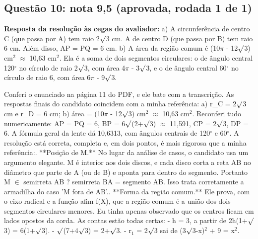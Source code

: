 \documentclass{article}%
\begin{document}
\subsection*{Questão 10: nota 9,5 (aprovada, rodada 1 de 1)}%
\textbf{Resposta da resolução às cegas do avaliador:} a) A circunferência de centro C (que passa por A) tem raio 2$\surd$3 cm. A de centro D (que passa por B) tem raio 6 cm. Além disso, AP = PQ = 6 cm.\newline%
\newline%
b) A área da região comum é (10$\pi$ - 12$\surd$3) cm$^2$ $\approx$ 10,63 cm$^2$. Ela é a soma de dois segmentos circulares: o de ângulo central 120$^\circ$ no círculo de raio 2$\surd$3, com área 4$\pi$ - 3$\surd$3, e o de ângulo central 60$^\circ$ no círculo de raio 6, com área 6$\pi$ - 9$\surd$3.\par %
Conferi o enunciado na página 11 do PDF, e ele bate com a transcrição. As respostas finais do candidato coincidem com a minha referência: a) r\_C = 2$\surd$3 cm e r\_D = 6 cm; b) área = (10$\pi$ - 12$\surd$3) cm$^2$ $\approx$ 10,63 cm$^2$. Reconferi tudo numericamente: AP = PQ = 6, BP = 6$\surd$(2+$\surd$3) $\approx$ 11,591, CP = 2$\surd$3, DP = 6. A fórmula geral da lente dá 10,6313, com ângulos centrais de 120$^\circ$ e 60$^\circ$.\newline%
\newline%
A resolução está correta, completa e, em dois pontos, é mais rigorosa que a minha referência:. **Posição de M.** No lugar da análise de casos, o candidato usa um argumento elegante. M é interior aos dois discos, e cada disco corta a reta AB no diâmetro que parte de A (ou de B) e aponta para dentro do segmento. Portanto M $\in$ semirreta AB ? semirreta BA = segmento AB. Isso trata corretamente a armadilha do caso 'M fora de AB'.. **Forma da região comum.** Ele prova, com o eixo radical e a função afim f(X), que a região comum é a união dos dois segmentos circulares menores. Eu tinha apenas observado que os centros ficam em lados opostos da corda.\newline%
\newline%
As contas estão todas certas:\newline%
{-} h = 3, a partir de 2h(1+$\surd$3) = 6(1+$\surd$3).\newline%
{-} $\surd$(7+4$\surd$3) = 2+$\surd$3.\newline%
{-} r$_{1}$ = 2$\surd$3 sai de (3$\surd$3-x)$^2$ + 9 = x$^2$.\newline%
\end{document}

